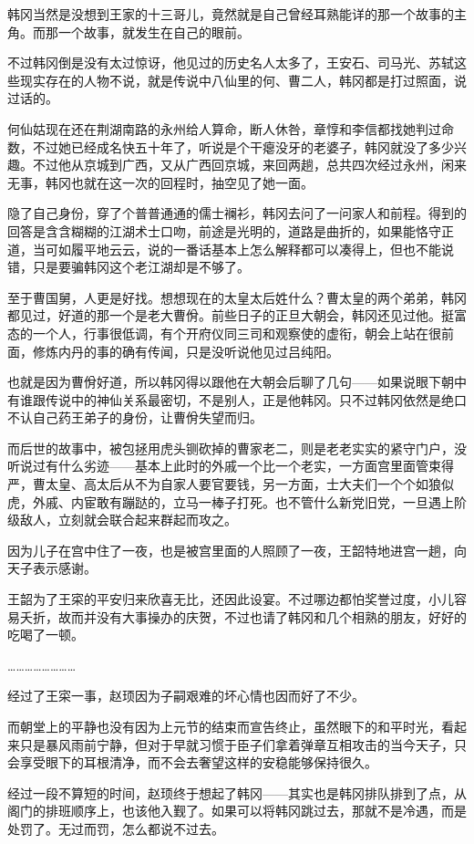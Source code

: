 韩冈当然是没想到王家的十三哥儿，竟然就是自己曾经耳熟能详的那一个故事的主角。而那一个故事，就发生在自己的眼前。

不过韩冈倒是没有太过惊讶，他见过的历史名人太多了，王安石、司马光、苏轼这些现实存在的人物不说，就是传说中八仙里的何、曹二人，韩冈都是打过照面，说过话的。

何仙姑现在还在荆湖南路的永州给人算命，断人休咎，章惇和李信都找她判过命数，不过她已经成名快五十年了，听说是个干瘪没牙的老婆子，韩冈就没了多少兴趣。不过他从京城到广西，又从广西回京城，来回两趟，总共四次经过永州，闲来无事，韩冈也就在这一次的回程时，抽空见了她一面。

隐了自己身份，穿了个普普通通的儒士襕衫，韩冈去问了一问家人和前程。得到的回答是含含糊糊的江湖术士口吻，前途是光明的，道路是曲折的，如果能恪守正道，当可如履平地云云，说的一番话基本上怎么解释都可以凑得上，但也不能说错，只是要骗韩冈这个老江湖却是不够了。

至于曹国舅，人更是好找。想想现在的太皇太后姓什么？曹太皇的两个弟弟，韩冈都见过，好道的那一个是老大曹佾。前些日子的正旦大朝会，韩冈还见过他。挺富态的一个人，行事很低调，有个开府仪同三司和观察使的虚衔，朝会上站在很前面，修炼内丹的事的确有传闻，只是没听说他见过吕纯阳。

也就是因为曹佾好道，所以韩冈得以跟他在大朝会后聊了几句——如果说眼下朝中有谁跟传说中的神仙关系最密切，不是别人，正是他韩冈。只不过韩冈依然是绝口不认自己药王弟子的身份，让曹佾失望而归。

而后世的故事中，被包拯用虎头铡砍掉的曹家老二，则是老老实实的紧守门户，没听说过有什么劣迹——基本上此时的外戚一个比一个老实，一方面宫里面管束得严，曹太皇、高太后从不为自家人要官要钱，另一方面，士大夫们一个个如狼似虎，外戚、内宦敢有蹦跶的，立马一棒子打死。也不管什么新党旧党，一旦遇上阶级敌人，立刻就会联合起来群起而攻之。

因为儿子在宫中住了一夜，也是被宫里面的人照顾了一夜，王韶特地进宫一趟，向天子表示感谢。

王韶为了王寀的平安归来欣喜无比，还因此设宴。不过哪边都怕奖誉过度，小儿容易夭折，故而并没有大事操办的庆贺，不过也请了韩冈和几个相熟的朋友，好好的吃喝了一顿。

……………………

经过了王寀一事，赵顼因为子嗣艰难的坏心情也因而好了不少。

而朝堂上的平静也没有因为上元节的结束而宣告终止，虽然眼下的和平时光，看起来只是暴风雨前宁静，但对于早就习惯于臣子们拿着弹章互相攻击的当今天子，只会享受眼下的耳根清净，而不会去奢望这样的安稳能够保持很久。

经过一段不算短的时间，赵顼终于想起了韩冈——其实也是韩冈排队排到了点，从阁门的排班顺序上，也该他入觐了。如果可以将韩冈跳过去，那就不是冷遇，而是处罚了。无过而罚，怎么都说不过去。

